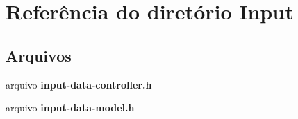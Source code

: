 \section{Referência do diretório Input}
\label{dir_d8c38c1f9123a5fe6ac3272b7a2cda27}
\subsection*{Arquivos}
\begin{DoxyCompactItemize}
\item 
arquivo {\bf input-\/data-\/controller.\+h}
\item 
arquivo {\bf input-\/data-\/model.\+h}
\end{DoxyCompactItemize}
